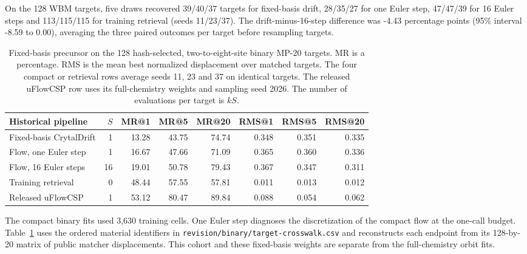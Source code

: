 On the 128 WBM targets, five draws recovered 39/40/37 targets for fixed-basis drift, 28/35/27 for one Euler step, 47/47/39 for 16 Euler steps and 113/115/115 for training retrieval (seeds 11/23/37). The drift-minus-16-step difference was -4.43 percentage points (95\% interval -8.59 to 0.00), averaging the three paired outcomes per target before resampling targets.

\begin{table}[!htbp]\centering\small\setlength{\tabcolsep}{3.6pt}
\caption{Fixed-basis precursor on the 128 hash-selected, two-to-eight-site binary MP-20 targets. MR is a percentage. RMS is the mean best normalized displacement over matched targets. The four compact or retrieval rows average seeds 11, 23 and 37 on identical targets. The released uFlowCSP row uses its full-chemistry weights and sampling seed 2026. The number of evaluations per target is $kS$.}\label{tab:historical-binary}
\begin{tabular}{lrrrrrrr}\hline
Historical pipeline & $S$ & MR@1 & MR@5 & MR@20 & RMS@1 & RMS@5 & RMS@20\\\hline
Fixed-basis CrytalDrift & 1 & 13.28 & 43.75 & 74.74 & 0.348 & 0.351 & 0.335\\
Flow, one Euler step & 1 & 16.67 & 47.66 & 71.09 & 0.365 & 0.360 & 0.336\\
Flow, 16 Euler steps & 16 & 19.01 & 50.78 & 79.43 & 0.367 & 0.347 & 0.311\\
Training retrieval & 0 & 48.44 & 57.55 & 57.81 & 0.011 & 0.013 & 0.012\\
Released uFlowCSP & 1 & 53.12 & 80.47 & 89.84 & 0.088 & 0.054 & 0.062\\
\hline\end{tabular}\end{table}

The compact binary fits used 3,630 training cells. One Euler step diagnoses the discretization of the compact flow at the one-call budget. Table~\ref{tab:historical-binary} uses the ordered material identifiers in \texttt{revision/binary/target-crosswalk.csv} and reconstructs each endpoint from its 128-by-20 matrix of public matcher displacements. This cohort and these fixed-basis weights are separate from the full-chemistry orbit fits.
